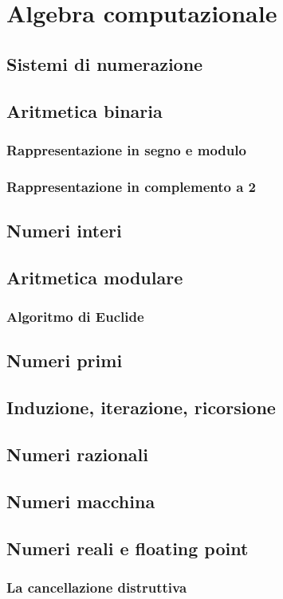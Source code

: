\chapter{Algebra computazionale}
\section{Sistemi di numerazione}
\section{Aritmetica binaria}
\subsection{Rappresentazione in segno e modulo}
\subsection{Rappresentazione in complemento a 2}
\section{Numeri interi}
\section{Aritmetica modulare}
\subsection{Algoritmo di Euclide}
\section{Numeri primi}
\section{Induzione, iterazione, ricorsione}
\section{Numeri razionali}
\section{Numeri macchina}
\section{Numeri reali e floating point}
\subsection{La cancellazione distruttiva}
